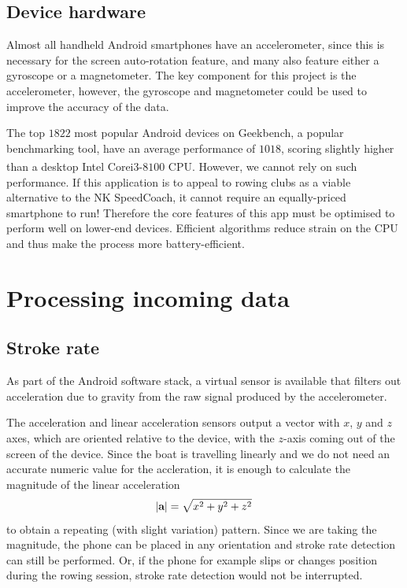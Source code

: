\documentclass[11pt,twoside,a4paper]{report}
\begin{document}
\subsection{Device hardware}

Almost all handheld Android smartphones have an accelerometer, since this is necessary for the screen auto-rotation feature, and many also feature either a gyroscope or a magnetometer.\cite{android_motion_sensors} 
The key component for this project is the accelerometer, however, the gyroscope and magnetometer could be used to improve the accuracy of the data.

The top $1822$ most popular Android devices on Geekbench, a popular benchmarking tool, have an average performance of $1018$, scoring slightly higher than a desktop Intel\textsuperscript{\textregistered} Core\texttrademark i$3$-$8100$ CPU. \cite{android_benchmarks} However, we cannot rely on such performance. If this application is to appeal to rowing clubs as a viable alternative to the NK SpeedCoach, it cannot require an equally-priced smartphone to run! Therefore the core features of this app must be optimised to perform well on lower-end devices.
Efficient algorithms reduce strain on the CPU and thus make the process more battery-efficient.

\section{Processing incoming data}

\subsection{Stroke rate}

As part of the Android software stack, a virtual sensor is available that filters out acceleration due to gravity from the raw signal produced by the accelerometer.\cite{android_linear_accel} 

The acceleration and linear acceleration sensors output a vector with $x$, $y$ and $z$ axes, which are oriented relative to the device, with the $z$-axis coming out of the screen of the device. 
Since the boat is travelling linearly and we do not need an accurate numeric value for the accleration, it is enough to calculate the magnitude of the linear acceleration
\[
  \abs{\textbf{a}} = \sqrt{x^2 + y^2 + z^2} 
\] 
to obtain a repeating (with slight variation) pattern. Since we are taking the magnitude, the phone can be placed in any orientation and stroke rate detection can still be performed. Or, if the phone for example slips or changes position during the rowing session, stroke rate detection would not be interrupted. 
\end{document}
